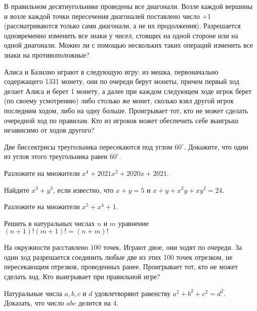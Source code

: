 \documentclass{article}
\begin{document}
\begin{enumerate_boxed}
        \item В правильном десятиугольнике проведены все диагонали.
        Возле каждой вершины и возле каждой точки пересечения диагоналей поставлено число +1 (рассматриваются только сами диагонали, а не их продолжения).
        Разрешается одновременно изменить все знаки у чисел, стоящих на одной стороне или на одной диагонали.
        Можно ли с помощью нескольких таких операций изменить все знаки на противоположные?

        \item Алиса и Базилио играют в следующую игру:
        из мешка, первоначально содержащего 1331 монету, они по очереди берут монеты, причем первый ход делает Алиса и берет 1 монету, а далее при каждом следующем ходе игрок берет (по своему усмотрению) либо столько же монет, сколько взял другой игрок последним ходом, либо на одну больше.
        Проигрывает тот, кто не может сделать очередной ход по правилам.
        Кто из игроков может обеспечить себе выигрыш независимо от ходов другого?

        \item Две биссектрисы треугольника пересекаются под углом $60^\circ$.
        Докажите, что один из углов этого треугольника равен $60^\circ$.

        \item Разложите на множители $x^4 + 2021x^2 + 2020x + 2021$.

        \item Найдите $x^3 + y^3$, если известно, что $x + y = 5$ и $x + y + x^{2}y + xy^2 = 24$.

        \item Разложите на множители $x^5 + x^4 + 1$.

        \item Решить в натуральных числах $n$ и $m$ уравнение $(n+1)!(m+1)!=(n+m)!$

        \item На окружности расставлено 100 точек.
        Играют двое, они ходят по очереди.
        За один ход разрешается соединить любые две из этих 100 точек отрезком, не пересекающим отрезков, проведенных ранее.
        Проигрывает тот, кто не может сделать ход.
        Кто выигрывает при правильной игре?

        \item Натуральные числа $a, b, c$ и $d$ удовлетворяют равенству $a^2 + b^2 + c^2 = d^2$.
        Доказать, что число $abc$ делится на 4.

    \end{enumerate_boxed}
\end{document}
